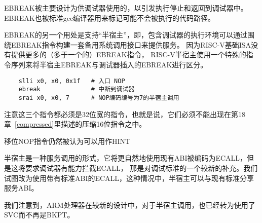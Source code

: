 \begin{commentary}
  EBREAK被主要设计为供调试器使用的，以引发执行停止和返回到调试器中。
  EBREAK也被标准gcc编译器用来标记可能不会被执行的代码路径。

  EBREAK的另一个用处是支持“半宿主”，即，包含调试器的执行环境可以通过围绕EBREAK指令构建一套备用系统调用接口来提供服务。
  因为RISC-V基础ISA没有提供更多的（多于一个的）EBREAK指令，
  RISC-V半宿主使用一个特殊的指令序列来将半宿主EBREAK与调试器插入的EBREAK进行区分。
\begin{verbatim}
    slli x0, x0, 0x1f   # 入口 NOP
    ebreak              # 中断到调试器
    srai x0, x0, 7      # NOP编码编号为7的半宿主调用
\end{verbatim}
  注意这三个指令都必须是32位宽的指令，也就是说，它们必须不能出现在第18章~\ref{compressed}里描述的压缩16位指令之中。
  
   移位NOP指令仍然被认为可以用作HINT

   半宿主是一种服务调用的形式，它将更自然地使用现有ABI被编码为ECALL，但是这将要求调试器有能力拦截ECALL，
   那是对调试标准的一个较新的补充。我们试图改为使用带有标准ABI的ECALL，这种情况中，半宿主可以与现有标准分享服务ABI。
  
   我们注意到，ARM处理器在较新的设计中，对于半宿主调用，也已经转为使用了SVC而不再是BKPT。
\end{commentary}

